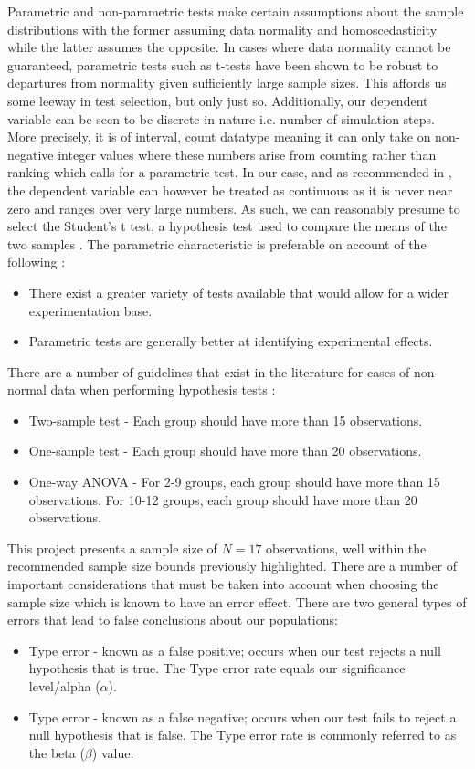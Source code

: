 \documentclass{report}
\newcommand{\rom}[1]{\uppercase\expandafter{\romannumeral #1\relax}}
\begin{document}
Parametric and non-parametric tests make certain assumptions about the sample distributions with the former assuming data normality and homoscedasticity while the latter assumes the opposite. In cases where data normality cannot be guaranteed, parametric tests such as t-tests have been shown to be robust to departures from normality given sufficiently large sample sizes. This affords us some leeway in test selection, but only just so. Additionally, our dependent variable can be seen to be discrete in nature i.e. number of simulation steps. More precisely, it is of interval, count datatype meaning it can only take on non-negative integer values where these numbers arise from counting rather than ranking which calls for a parametric test. In our case, and as recommended in \cite{CountCont}, the dependent variable can however be treated as continuous as it is never near zero and ranges over very large numbers. As such, we can reasonably presume to select the Student's t test, a hypothesis test used to compare the means of the two samples \cite{Donald2008}. The parametric characteristic is preferable on account of the following \cite{Field2012}:
\begin{itemize}
	\item There exist a greater variety of tests available that would allow for a wider experimentation base.
	\item Parametric tests are generally better at identifying experimental effects.
\end{itemize}

There are a number of guidelines that exist in the literature for cases of non-normal data when performing hypothesis tests \cite{MTGuides}:
\begin{itemize}
	\item Two-sample test - Each group should have more than 15 observations.
	\item One-sample test - Each group should have more than 20 observations.
	\item One-way ANOVA - For 2-9 groups, each group should have more than 15 observations. For 10-12 groups, each group should have more than 20 observations.
\end{itemize}

This project presents a sample size of $N=17$ observations, well within the recommended sample size bounds previously highlighted. There are a number of important considerations that must be taken into account when choosing the sample size which is known to have an error effect. There are two general types of errors that lead to false conclusions about our populations:
\begin{itemize}
	\item Type \rom{1} error - known as a false positive; occurs when our test rejects a null hypothesis that is true. The Type \rom{1} error rate equals our significance level/alpha ($\alpha$).
	\item Type \rom{2} error - known as a false negative; occurs when our test fails to reject a null hypothesis that is false. The Type \rom{2} error rate is commonly referred to as the beta ($\beta$) value.
\end{itemize}
\end{document}
